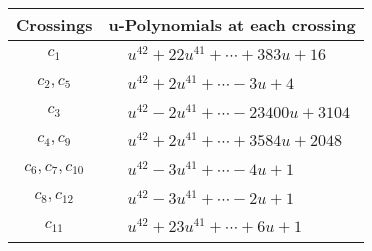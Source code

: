 \documentclass[1p]{elsarticle_modified}
\theoremstyle{definition}
\begin{document}
\begin{tabular}{m{50pt}|m{274pt}}
Crossings & \hspace{64pt}u-Polynomials at each crossing \\
\hline $$\begin{aligned}c_{1}\end{aligned}$$&$\begin{aligned}
&u^{42}+22 u^{41}+\cdots+383 u+16
\end{aligned}$\\
\hline $$\begin{aligned}c_{2},c_{5}\end{aligned}$$&$\begin{aligned}
&u^{42}+2 u^{41}+\cdots-3 u+4
\end{aligned}$\\
\hline $$\begin{aligned}c_{3}\end{aligned}$$&$\begin{aligned}
&u^{42}-2 u^{41}+\cdots-23400 u+3104
\end{aligned}$\\
\hline $$\begin{aligned}c_{4},c_{9}\end{aligned}$$&$\begin{aligned}
&u^{42}+2 u^{41}+\cdots+3584 u+2048
\end{aligned}$\\
\hline $$\begin{aligned}c_{6},c_{7},c_{10}\end{aligned}$$&$\begin{aligned}
&u^{42}-3 u^{41}+\cdots-4 u+1
\end{aligned}$\\
\hline $$\begin{aligned}c_{8},c_{12}\end{aligned}$$&$\begin{aligned}
&u^{42}-3 u^{41}+\cdots-2 u+1
\end{aligned}$\\
\hline $$\begin{aligned}c_{11}\end{aligned}$$&$\begin{aligned}
&u^{42}+23 u^{41}+\cdots+6 u+1
\end{aligned}$\\
\hline
\end{tabular}\\~\\
\newpage\renewcommand{\arraystretch}{1}
\end{document}
